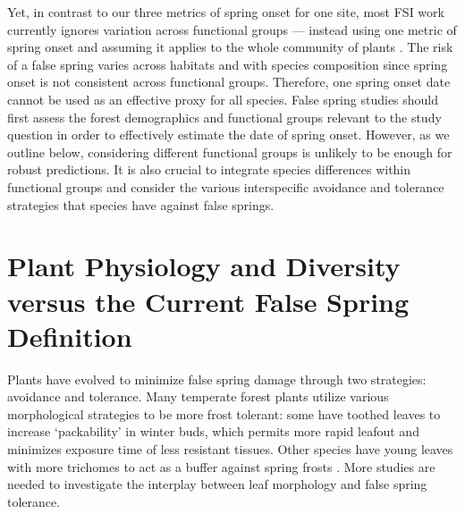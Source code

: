 \documentclass{article}\usepackage[]{graphicx}\usepackage[]{color}
\begin{document}
Yet, in contrast to our three metrics of spring onset for one site, most FSI work currently ignores variation across functional groups --- instead using one metric of spring onset and assuming it applies to the whole community of plants \citep{Marino2011, Peterson2014, Allstadt2015, Mehdipoor2017}. The risk of a false spring varies across habitats and with species composition since spring onset is not consistent across functional groups. Therefore, one spring onset date cannot be used as an effective proxy for all species. False spring studies should first assess the forest demographics and functional groups relevant to the study question in order to effectively estimate the date of spring onset. However, as we outline below, considering different functional groups is unlikely to be enough for robust predictions. It is also crucial to integrate species differences within functional groups and consider the various interspecific avoidance and tolerance strategies that species have against false springs. %

\section {Plant Physiology and Diversity versus the Current False Spring Definition}
Plants have evolved to minimize false spring damage through two strategies: avoidance and tolerance. Many temperate forest plants utilize various morphological strategies to be more frost tolerant: some have toothed leaves to increase `packability' in winter buds, which permits more rapid leafout \citep{Edwards2017} and minimizes exposure time of less resistant tissues. Other species have young leaves with more trichomes to act as a buffer against spring frosts \citep{Agrawal2004, Prozherina2003}.%
More studies are needed to investigate the interplay between leaf morphology and false spring tolerance. 
\end{document}
